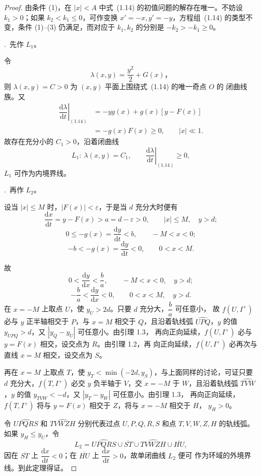 \begin{proof}
由条件 (1)，在 $|x|<A$ 中式~(1.14) 的初值问题的解存在唯一。不妨设
$k_1>0$；如果 $k_2<k_1\leq0$，可作变换 $x'=-x,y'=-y$，方程组~(1.14)
的类型不变，条件 (1)--(3) 仍满足，而对应于 $k_1,k_2$ 的分别是
$-k_2>-k_1\geq0$。

.~先作 $L_1$。

令
\[
  \lambda(x,y)=\dfrac{y^2}{2}+G(x)，
\]
则 $\lambda(x,y)=C>0$ 为 $(x,y)$ 平面上围绕式~(1.14) 的唯一奇点 $O$ 的
闭曲线族。又
\[
\begin{aligned}
  \left.\dfrac{\mathrm{d}\lambda}{\mathrm{d}t}\right|_{(1.14)}
  &=-y g(x)+g(x)[y-F(x)]\\
  &=-g(x)F(x)\geq0,\qquad |x|\ll1.
\end{aligned}
\]
故存在充分小的 $C_1>0$，沿着闭曲线
\[
  L_1:\ \lambda(x,y)=C_1,\qquad
  \left.\dfrac{\mathrm{d}\lambda}{\mathrm{d}t}\right|_{(1.14)}\geq0,
\]
$L_1$ 可作为内境界线。

.~再作 $L_2$。

设当 $|x|\leq M$ 时，$|F(x)|<\varepsilon$，于是当 $d$ 充分大时便有
\[
  \dfrac{\mathrm{d}x}{\mathrm{d}t}=y-F(x)>a=d-\varepsilon>0,
  \qquad |x|\leq M,\quad y>d;
\]
\[
  0\leq-g(x)=\dfrac{\mathrm{d}y}{\mathrm{d}t}<b,
  \qquad -M<x<0;
\]
\[
  -b<-g(x)=\dfrac{\mathrm{d}y}{\mathrm{d}t}<0,
  \qquad 0<x<M.
\]


故
\[
  0<\dfrac{\mathrm{d}y}{\mathrm{d}x}<\dfrac{b}{a},
  \qquad -M<x<0,\quad y>d;
\]
\[
  -\dfrac{b}{a}<\dfrac{\mathrm{d}y}{\mathrm{d}x}<0,
  \qquad 0<x<M,\quad y>d.
\]
在 $x=-M$ 上取点 $U$，使 $y_U>2d$。只要 $d$ 充分大，$\dfrac ba$ 可任意小，
故 $f(U,I^+)$ 必与 $y$ 正半轴相交于 $P$，与 $x=M$ 相交于 $Q$，且沿着轨线弧
$\widehat{UPQ}$，$y$ 的值 $y_{UPQ}>d$，又 $|y_Q-y_U|$ 可任意小。由引理 1.3，
再向正向延续，$f(U,I^+)$ 必与 $y=F(x)$ 相交，设交点为 $R$。由引理 1.2，再
向正向延续，$f(U,I^+)$ 必再次与直线 $x=M$ 相交，设交点为 $S$。

再在 $x=M$ 上取点 $T$，使 $y_T<\min(-2d,y_S)$，与上面同样的讨论，可证只要
$d$ 充分大，$f(T,I^+)$ 必交 $y$ 负半轴于 $V$，交 $x=-M$ 于 $W$，且沿着轨线弧
$\widehat{TVW}$，$y$ 的值 $y_{TVW}<-d$，又 $|y_T-y_W|$ 可任意小。由引理 1.3，
再向正向延续，$f(T,I^+)$ 将与 $y=F(x)$ 相交于 $Z$，将与 $x=-M$ 相交于 $H$，
$y_H>0$。

令 $\widehat{UPQRS}$ 和 $\widehat{TVWZH}$ 分别代表过点 $U,P,Q,R,S$ 和点
$T,V,W,Z,H$ 的轨线弧。如果 $y_H\leq y_U$，令
\[
  L_2=\widehat{UPQRS}\cup\overline{ST}\cup\widehat{TVWZH}
  \cup\overline{HU},
\]
因在 $\overline{ST}$ 上 $\dfrac{\mathrm{d}x}{\mathrm{d}t}<0$；在
$\overline{HU}$ 上 $\dfrac{\mathrm{d}x}{\mathrm{d}t}>0$，故单闭曲线 $L_2$ 便可
作为环域的外境界线。到此定理得证。


\end{proof}
